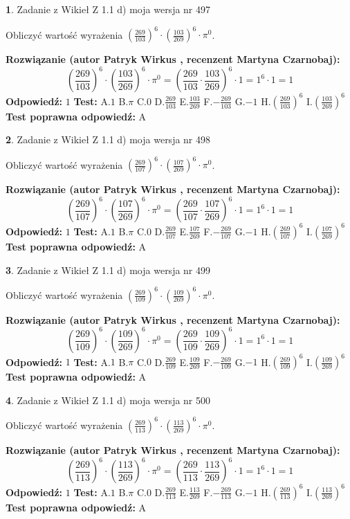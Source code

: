 \documentclass[12pt, a4paper]{article}
\theoremstyle{definition} %
\newtheorem{zad}{}
\newcommand{\zadStart}[1]{\begin{zad}#1\newline}
\newcommand{\zadStop}{\end{zad}}
\newcommand{\rozwStart}[2]{\noindent \textbf{Rozwiązanie (autor #1 , recenzent #2): }\newline}
\newcommand{\rozwStop}{\newline}
\newcommand{\odpStart}{\noindent \textbf{Odpowiedź:}\newline}
\newcommand{\odpStop}{\newline}
\newcommand{\testStart}{\noindent \textbf{Test:}\newline}
\newcommand{\testStop}{\newline}
\newcommand{\kluczStart}{\noindent \textbf{Test poprawna odpowiedź:}\newline}
\newcommand{\kluczStop}{\newline}
\begin{document}
\zadStart{Zadanie z Wikieł Z 1.1 d) moja wersja nr 497}

Obliczyć wartość wyrażenia $(\frac{269}{103})^{6} \cdot (\frac{103}{269})^{6} \cdot \pi^{0}$.
\zadStop
\rozwStart{Patryk Wirkus}{Martyna Czarnobaj}
$$(\frac{269}{103})^{6} \cdot (\frac{103}{269})^{6} \cdot \pi^{0} = (\frac{269}{103} \cdot \frac{103}{269})^{6} \cdot 1 = 1^{6} \cdot 1 = 1$$
\rozwStop
\odpStart
$1$
\odpStop
\testStart
A.$1$ B.$\pi$ C.$0$ D.$\frac{269}{103}$ E.$\frac{103}{269}$
F.$-\frac{269}{103}$ G.$-1$
H.$(\frac{269}{103})^{6}$
I.$(\frac{103}{269})^{6}$
\testStop
\kluczStart
A
\kluczStop



\zadStart{Zadanie z Wikieł Z 1.1 d) moja wersja nr 498}

Obliczyć wartość wyrażenia $(\frac{269}{107})^{6} \cdot (\frac{107}{269})^{6} \cdot \pi^{0}$.
\zadStop
\rozwStart{Patryk Wirkus}{Martyna Czarnobaj}
$$(\frac{269}{107})^{6} \cdot (\frac{107}{269})^{6} \cdot \pi^{0} = (\frac{269}{107} \cdot \frac{107}{269})^{6} \cdot 1 = 1^{6} \cdot 1 = 1$$
\rozwStop
\odpStart
$1$
\odpStop
\testStart
A.$1$ B.$\pi$ C.$0$ D.$\frac{269}{107}$ E.$\frac{107}{269}$
F.$-\frac{269}{107}$ G.$-1$
H.$(\frac{269}{107})^{6}$
I.$(\frac{107}{269})^{6}$
\testStop
\kluczStart
A
\kluczStop



\zadStart{Zadanie z Wikieł Z 1.1 d) moja wersja nr 499}

Obliczyć wartość wyrażenia $(\frac{269}{109})^{6} \cdot (\frac{109}{269})^{6} \cdot \pi^{0}$.
\zadStop
\rozwStart{Patryk Wirkus}{Martyna Czarnobaj}
$$(\frac{269}{109})^{6} \cdot (\frac{109}{269})^{6} \cdot \pi^{0} = (\frac{269}{109} \cdot \frac{109}{269})^{6} \cdot 1 = 1^{6} \cdot 1 = 1$$
\rozwStop
\odpStart
$1$
\odpStop
\testStart
A.$1$ B.$\pi$ C.$0$ D.$\frac{269}{109}$ E.$\frac{109}{269}$
F.$-\frac{269}{109}$ G.$-1$
H.$(\frac{269}{109})^{6}$
I.$(\frac{109}{269})^{6}$
\testStop
\kluczStart
A
\kluczStop



\zadStart{Zadanie z Wikieł Z 1.1 d) moja wersja nr 500}

Obliczyć wartość wyrażenia $(\frac{269}{113})^{6} \cdot (\frac{113}{269})^{6} \cdot \pi^{0}$.
\zadStop
\rozwStart{Patryk Wirkus}{Martyna Czarnobaj}
$$(\frac{269}{113})^{6} \cdot (\frac{113}{269})^{6} \cdot \pi^{0} = (\frac{269}{113} \cdot \frac{113}{269})^{6} \cdot 1 = 1^{6} \cdot 1 = 1$$
\rozwStop
\odpStart
$1$
\odpStop
\testStart
A.$1$ B.$\pi$ C.$0$ D.$\frac{269}{113}$ E.$\frac{113}{269}$
F.$-\frac{269}{113}$ G.$-1$
H.$(\frac{269}{113})^{6}$
I.$(\frac{113}{269})^{6}$
\testStop
\kluczStart
A
\kluczStop
\end{document}
